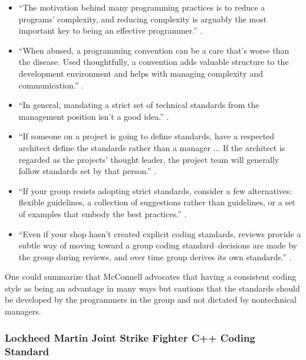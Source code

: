 \begin{itemize}
{}\item ``The motivation behind many programming practices is to reduce a
programs' complexity, and reducing complexity is arguably the most important
key to being an effective programmer.''  {}\cite[Chapter
34]{CodeComplete2nd04}.

{}\item ``When abused, a programming convention can be a care that's worse
than the disease.  Used thoughtfully, a convention adds valuable structure to
the development environment and helps with managing complexity and
communication.''  {}\cite[Chapter 34]{CodeComplete2nd04}.

{}\item ``In general, mandating a strict set of technical standards from the
management position isn't a good idea.''  {}\cite[Section
28.1]{CodeComplete2nd04}.

{}\item ``If someone on a project is going to define standards, have a
respected architect define the standards rather than a manager ... If the
architect is regarded as the projects' thought leader, the project team will
generally follow standards set by that person.''  {}\cite[Section
28.1]{CodeComplete2nd04}.

{}\item ``If your group resists adopting strict standards, consider a few
alternatives: flexible guidelines, a collection of suggestions rather than
guidelines, or a set of examples that embody the best practices.''
{}\cite[Section 28.1]{CodeComplete2nd04}.

{}\item ``Even if your shop hasn't created explicit coding standards, reviews
provide a subtle way of moving toward a group coding standard--decisions are
made by the group during reviews, and over time group derives its own
standards.''  {}\cite[Section 28.1]{CodeComplete2nd04}.

\end{itemize}

One could summarize that McConnell advocates that having a consistent coding
style as being an advantage in many ways but cautions that the standards
should be developed by the programmers in the group and not dictated by
nontechnical managers.


%
\subsubsection{Lockheed Martin Joint Strike Fighter C++ Coding Standard}
%

